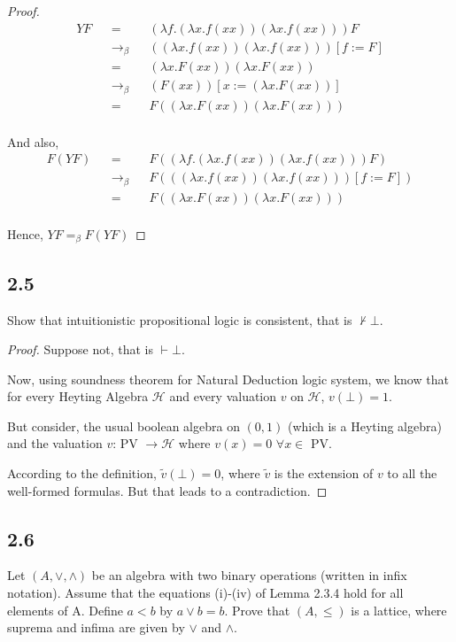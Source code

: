 \documentclass[12pt]{article}
\begin{document}
\begin{proof}
\begin{align*}
    YF &&=&& (\lambda f.(\lambda x.f (xx))(\lambda x.f (xx)))F \\
    &&\rightarrow_\beta&& ((\lambda x.f (xx))(\lambda x.f (xx)))[f:=F] \\
    &&=&& (\lambda x.F (xx))(\lambda x.F (xx)) \\
    &&\rightarrow_\beta&& (F (xx))[x:=(\lambda x.F (xx))] \\
    &&=&& F ((\lambda x.F (xx))(\lambda x.F (xx))) \\
\end{align*}

And also,
\begin{align*}
    F(YF) &&=&& F\left((\lambda f.(\lambda x.f (xx))(\lambda x.f (xx)))F\right) \\
    &&\rightarrow_\beta&& F\left(((\lambda x.f (xx))(\lambda x.f (xx)))[f:=F]\right) \\
    &&=&& F\left((\lambda x.F (xx))(\lambda x.F (xx))\right) \\
\end{align*}

Hence, $YF =_\beta F(YF)$
\end{proof}


\subsection*{2.5}
Show that intuitionistic propositional logic is consistent, that is $\not \vdash \bot$. \\

\begin{proof}
Suppose not, that is $\vdash \bot$.

Now, using soundness theorem for Natural Deduction logic system, we know that for every Heyting Algebra $\mathcal{H}$ and every valuation $v$ on $\mathcal{H}$, $v(\bot) = 1$.

But consider, the usual boolean algebra on $(0,1)$ (which is a Heyting algebra) and the valuation $v$: PV $\rightarrow \mathcal{H}$ where $v(x) = 0$ $\forall x \in$ PV.

According to the definition, $\widetilde{v}(\bot) = 0$, where $\widetilde{v}$ is the extension of $v$ to all the well-formed formulas. But that leads to a contradiction.
\end{proof}


\subsection*{2.6}
Let $(A, \vee, \wedge)$ be an algebra with two binary operations (written in infix notation). Assume that the equations (i)-(iv) of Lemma 2.3.4 hold for all elements of A. Define $a < b$ by $a \vee b = b$. Prove that $(A, \leq)$ is a lattice, where suprema and infima are given by $\vee$ and $\wedge$. \\ 
\end{document}
